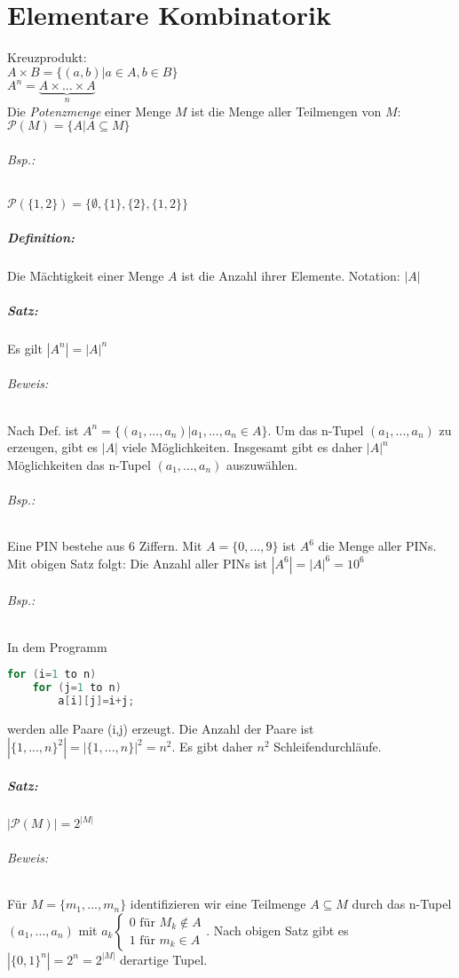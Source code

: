 \documentclass{scrreprt}
\begin{document}
\chapter{Elementare Kombinatorik}

Kreuzprodukt:\\
$A\times B = \{(a,b)|a \in A, b \in B\}$\\
$A^n=\underbrace{A\times ... \times A}_{n}$\\
Die \emph{Potenzmenge} einer Menge $M$ ist die Menge aller Teilmengen von $M$:
$\mathcal{P}(M)=\{A|A\subseteq M\}$
\subparagraph{Bsp.:} $\mathcal{P}(\{1,2\})=\{\emptyset, \{1\}, \{2\}, \{1,2\}\}$

\paragraph{Definition:} Die Mächtigkeit einer Menge $A$ ist die Anzahl ihrer Elemente. Notation: $|A|$

\paragraph{Satz:} Es gilt $|A^n|=|A|^n$
\subparagraph{Beweis:} 
Nach Def. ist $A^n=\{(a_1,...,a_n)|a_1,...,a_n \in A\}$. Um das n-Tupel $(a_1,...,a_n)$ zu erzeugen, gibt es $|A|$ viele Möglichkeiten. Insgesamt gibt es daher $|A|^n$ Möglichkeiten das n-Tupel $(a_1,...,a_n)$ auszuwählen.

\subparagraph{Bsp.:} Eine PIN bestehe aus 6 Ziffern. Mit $A=\{0,...,9\}$ ist $A^6$ die Menge aller PINs. Mit obigen Satz folgt: Die Anzahl aller PINs ist $|A^6|=|A|^6 = 10^6$

\subparagraph{Bsp.:} In dem Programm
\begin{lstlisting}[language=C]
for (i=1 to n)
	for (j=1 to n)
		a[i][j]=i+j;
\end{lstlisting}
werden alle Paare (i,j) erzeugt. Die Anzahl der Paare ist $|\{1,...,n\}^2|=|\{1,...,n\}|^2=n^2$. Es gibt daher $n^2$ Schleifendurchläufe.

\paragraph{Satz:} $|\mathcal{P}(M)|=2^{|M|}$
\subparagraph{Beweis:} Für $M=\{m_1, ...,m_n\}$ identifizieren wir eine Teilmenge $A\subseteq M$ durch das n-Tupel $(a_1, ..., a_n)$ mit $a_k\begin{cases}0\text{ für }M_k \not \in A\\ 1\text{ für }m_k \in A\end{cases}$. Nach obigen Satz gibt es $|\{0,1\}^n|=2^n=2^{|M|}$ derartige Tupel.
\end{document}
